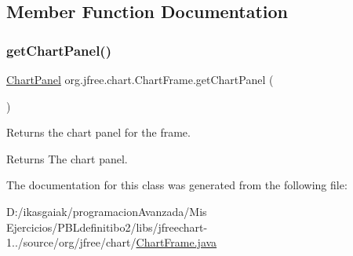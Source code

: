 \subsection{Member Function Documentation}
\mbox{\label{classorg_1_1jfree_1_1chart_1_1_chart_frame_aedcf8c3c29dcb699483f23bd0be94605}} 
\subsubsection{\texorpdfstring{get\+Chart\+Panel()}{getChartPanel()}}
{\footnotesize\ttfamily \mbox{\hyperlink{classorg_1_1jfree_1_1chart_1_1_chart_panel}{Chart\+Panel}} org.\+jfree.\+chart.\+Chart\+Frame.\+get\+Chart\+Panel (\begin{DoxyParamCaption}{ }\end{DoxyParamCaption})}

Returns the chart panel for the frame.

\begin{DoxyReturn}{Returns}
The chart panel. 
\end{DoxyReturn}


The documentation for this class was generated from the following file\+:\begin{DoxyCompactItemize}
\item 
D\+:/ikasgaiak/programacion\+Avanzada/\+Mis Ejercicios/\+P\+B\+Ldefinitibo2/libs/jfreechart-\/1../source/org/jfree/chart/\mbox{\hyperlink{_chart_frame_8java}{Chart\+Frame.\+java}}\end{DoxyCompactItemize}
